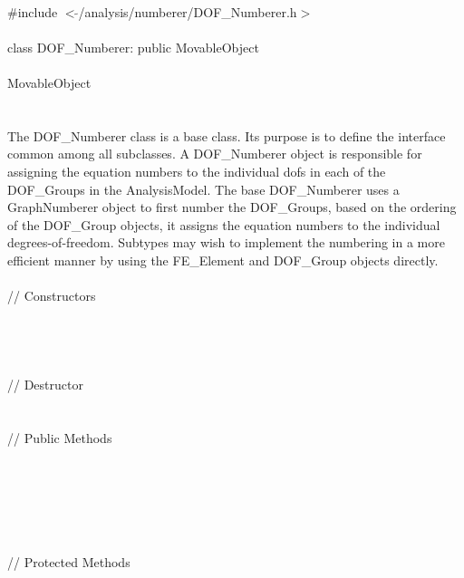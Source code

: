 
   \\
\indent \#include $<\tilde{ }$/analysis/numberer/DOF\_Numberer.h$>$  \\

  \\
\indent class DOF\_Numberer: public MovableObject  \\

 \\
\indent MovableObject \\
\indent{} \\

 \\ 
\indent The DOF\_Numberer class is a base class. Its purpose is
to define the interface common among all subclasses.  A DOF\_Numberer
object is responsible for assigning the equation numbers to the
individual dofs in each of the  DOF\_Groups in the AnalysisModel. The
base DOF\_Numberer uses a GraphNumberer object to first number the
DOF\_Groups, based on the ordering of the DOF\_Group objects, it
assigns the equation numbers to the individual
degrees-of-freedom. Subtypes may wish to implement the numbering in
a more efficient manner by using the FE\_Element and DOF\_Group objects
directly. \\


 \\
\indent // Constructors \\
\\ 
\\ 
\\  \\
\indent // Destructor \\
\\  \\
\indent // Public Methods \\
 \\ 
 \\
 \\
\\ 
\\ \\
\indent // Protected Methods  \\
 \\
 \\


